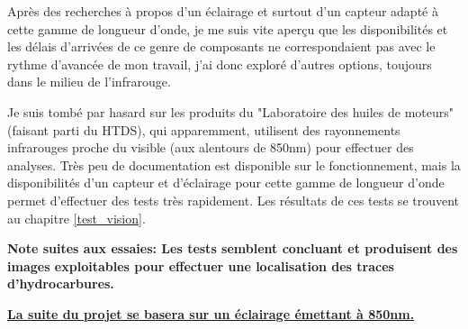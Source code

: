 Après des recherches à propos d'un éclairage et surtout d'un capteur adapté à cette gamme de longueur d'onde, je me suis vite aperçu
que les disponibilités et les délais d'arrivées de ce genre de composants ne correspondaient pas avec le rythme d'avancée de mon travail,
j'ai donc exploré d'autres options, toujours dans le milieu de l'infrarouge.

Je suis tombé par hasard sur les produits du "Laboratoire des huiles de moteurs" (faisant parti du HTDS), qui apparemment, utilisent
des rayonnements infrarouges proche du visible (aux alentours de 850nm) pour effectuer des analyses. Très peu de documentation est disponible sur le fonctionnement,
mais la disponibilités d'un capteur et d'éclairage pour cette gamme de longueur d'onde permet d'effectuer des tests très rapidement.
Les résultats de ces tests se trouvent au chapitre \ref{test_vision}.

\textbf{Note suites aux essaies: Les tests semblent concluant et produisent des images exploitables pour effectuer une localisation des
    traces d'hydrocarbures.}

\textbf{\underline{La suite du projet se basera sur un éclairage émettant à 850nm.}}